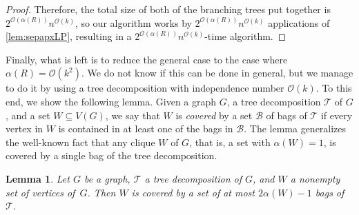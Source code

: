 \documentclass[11pt]{article}
\newtheorem{lemma}{Lemma}[section]
\theoremstyle{definition}
\newcommand{\td}{\mathcal{T}}
\newcommand{\OO}{\mathcal{O}}
\begin{document}
\begin{proof}
Therefore, the total size of both of the branching trees put together is $2^{\OO(\alpha(R))} n^{\OO(k)}$, so our algorithm works by $2^{\OO(\alpha(R))} n^{\OO(k)}$ applications of \cref{lem:sepapxLP}, resulting in a $2^{\OO(\alpha(R))} n^{\OO(k)}$-time algorithm.
\end{proof}

Finally, what is left is to reduce the general case to the case where $\alpha(R) = \OO(k^2)$.
We do not know if this can be done in general, but we manage to do it by using a tree decomposition with independence number $\OO(k)$.
To this end, we show the following lemma.
Given a graph $G$, a tree decomposition $\td$ of $G$, and a set $W\subseteq V(G)$, we say that $W$ is \emph{covered} by a set $\mathcal{B}$ of bags of $\td$ if every vertex in $W$ is contained in at least one of the bags in $\mathcal{B}$.
The lemma generalizes the well-known fact that any clique $W$ of $G$, that is, a set with $\alpha(W)=1$, is covered by a single bag of the tree decomposition.

\begin{lemma}
\label{lem:bag_cover_is}
Let $G$ be a graph, $\td$ a tree decomposition of $G$, and $W$ a nonempty set of vertices of~$G$.
Then $W$ is covered by a set of at most  $2 \alpha(W)-1$ bags of~$\td$.
\end{lemma}
\end{document}

